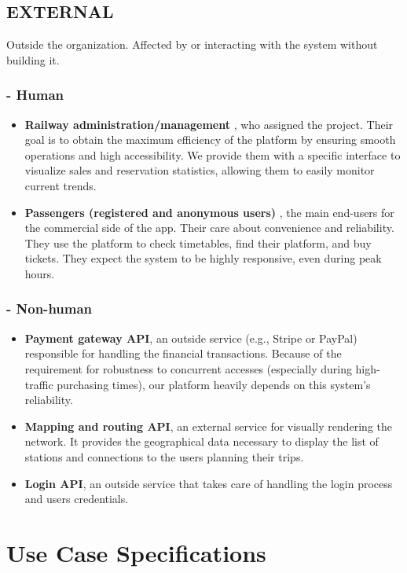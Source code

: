 \documentclass{article}
\begin{document}
\subsection{EXTERNAL}
Outside the organization. Affected by or interacting with the system without building it.

\subsubsection*{- Human}
\begin{itemize}
    \item \textbf{Railway administration/management} \label{STK1}, who assigned the project. Their goal is to obtain the maximum efficiency of the platform by ensuring smooth operations and high accessibility. We provide them with a specific interface to visualize sales and reservation statistics, allowing them to easily monitor current trends.
    \item \textbf{Passengers (registered and anonymous users)} \label{STK12}, the main end-users for the commercial side of the app. Their care about convenience and reliability. They use the platform to check timetables, find their platform, and buy tickets. They expect the system to be highly responsive, even during peak hours.
\end{itemize}

\subsubsection*{- Non-human}
\begin{itemize}
    \item \textbf{Payment gateway API}\label{STK16}, an outside service (e.g., Stripe or PayPal) responsible for handling the financial transactions. Because of the requirement for robustness to concurrent accesses (especially during high-traffic purchasing times), our platform heavily depends on this system's reliability.
    \item \textbf{Mapping and routing API}\label{STK17}, an external service for visually rendering the network. It provides the geographical data necessary to display the list of stations and connections to the users planning their trips.
    \item \textbf{Login API}\label{STK18}, an outside service that takes care of handling the login process and users credentials.
\end{itemize}
\newpage
\vspace{100mm}
\section{Use Case Specifications}
\end{document}
